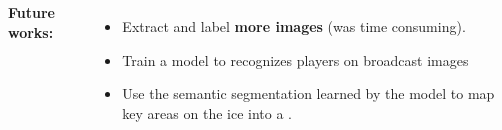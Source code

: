 \documentclass[25pt, a0paper,
               colspace=15mm, subcolspace=0mm,
               blockverticalspace=17mm]{tikzposter} %
\begin{document}
\begin{columns}
{    \textbf{Future works:}

    \begin{itemize}
        \item Extract and label \textbf{more images} (was time consuming).
        \item Train a model to recognizes players on broadcast images
        \item Use the semantic segmentation learned by the model to map key areas on the ice into a .
        \vspace{5mm}
    \end{itemize}
  }

  
\end{columns}
\end{document}
